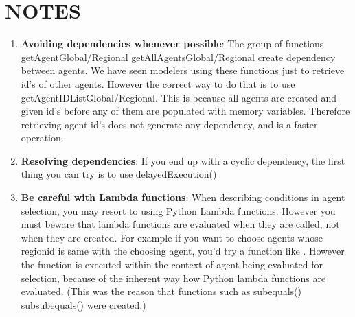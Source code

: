 \documentclass{article}
\begin{document}
\section{NOTES}
\begin{enumerate}
\item {\bf Avoiding dependencies whenever possible}: The group of functions getAgentGlobal/Regional getAllAgentsGlobal/Regional create dependency between agents. We have seen modelers using these functions just to retrieve id's of other agents. However the correct way to do that is to use getAgentIDListGlobal/Regional. This is because  all agents are created and  given id's before any of them are populated with memory variables. Therefore retrieving agent id's does not generate any dependency, and is a faster operation.
\item {\bf Resolving dependencies}: If you end up with a cyclic dependency, the first thing you can try is to use delayedExecution()
\item {\bf Be careful with Lambda functions}: When describing conditions in agent selection, you may resort to using Python Lambda functions. However you must beware that lambda functions are evaluated when they are called, not when they are created. For example if you want to choose agents whose regionid is same with the choosing agent, you'd try a function like . However the function is executed within the context of agent being evaluated for selection, because of the inherent way how Python lambda functions are evaluated. (This was the reason that functions such as subequals() subsubequals() were created.)
\end{enumerate}
\end{document}
